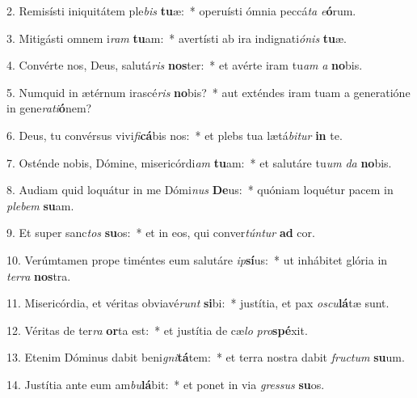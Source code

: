 2. Remisísti iniquitátem ple\textit{bis} \textbf{tu}æ:~*  operuísti ómnia peccá\textit{ta} \textit{e}\textbf{ó}rum.\

3. Mitigásti omnem i\textit{ram} \textbf{tu}am:~*  avertísti ab ira indignati\textit{ó}\textit{nis} \textbf{tu}æ.\

4. Convérte nos, Deus, salutá\textit{ris} \textbf{nos}ter:~*  et avérte iram tu\textit{am} \textit{a} \textbf{no}bis.\

5. Numquid in ætérnum irascé\textit{ris} \textbf{no}bis?~*  aut exténdes iram tuam a generatióne in gene\textit{ra}\textit{ti}\textbf{ó}nem?\

6. Deus, tu convérsus vivi\textit{fi}\textbf{cá}bis nos:~*  et plebs tua lætá\textit{bi}\textit{tur} \textbf{in} te.\

7. Osténde nobis, Dómine, misericórdi\textit{am} \textbf{tu}am:~*  et salutáre tu\textit{um} \textit{da} \textbf{no}bis.\

8. Audiam quid loquátur in me Dómi\textit{nus} \textbf{De}us:~*  quóniam loquétur pacem in \textit{ple}\textit{bem} \textbf{su}am.\

9. Et super sanc\textit{tos} \textbf{su}os:~*  et in eos, qui conver\textit{tún}\textit{tur} \textbf{ad} cor.\

10. Verúmtamen prope timéntes eum salutáre \textit{ip}\textbf{sí}us:~*  ut inhábitet glória in \textit{ter}\textit{ra} \textbf{nos}tra.\

11. Misericórdia, et véritas obviavé\textit{runt} \textbf{si}bi:~*  justítia, et pax \textit{os}\textit{cu}\textbf{lá}tæ sunt.\

12. Véritas de ter\textit{ra} \textbf{or}ta est:~*  et justítia de cæ\textit{lo} \textit{pro}\textbf{spé}xit.\

13. Etenim Dóminus dabit beni\textit{gni}\textbf{tá}tem:~*  et terra nostra dabit \textit{fruc}\textit{tum} \textbf{su}um.\

14. Justítia ante eum am\textit{bu}\textbf{lá}bit:~*  et ponet in via \textit{gres}\textit{sus} \textbf{su}os.\

